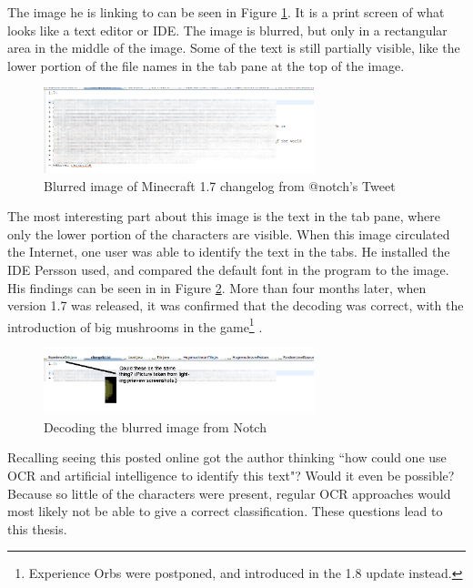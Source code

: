 The image he is linking to can be seen in Figure \ref{fig:notch_imgur}. It is a print screen of what looks like a text editor or \gls{IDE}. The image is blurred, but only in a rectangular area in the middle of the image. Some of the text is still partially visible, like the lower portion of the file names in the tab pane at the top of the image. 

\begin{figure}[ht]
    \centering
    \includegraphics[width=0.7\textwidth]{fig/chapter1/notch_eclipse.png}
    \caption{Blurred image of Minecraft 1.7 changelog from @notch's Tweet}
    \label{fig:notch_imgur}
\end{figure}

The most interesting part about this image is the text in the tab pane, where only the lower portion of the characters are visible. When this image circulated the Internet, one user was able to identify the text in the tabs. He installed the \gls{IDE} Persson used, and compared the default font in the program to the image. His findings can be seen in in Figure \ref{fig:notch_eclipse_decoded}. More than four months later, when version 1.7 was released, it was confirmed that the decoding was correct, with the introduction of big mushrooms in the game\footnote{Experience Orbs were postponed, and introduced in the 1.8 update instead.} \cite{misc-minecraft.172-changelog}.

\begin{figure}[ht]
    \centering
    \includegraphics[width=0.7\textwidth]{fig/chapter1/notch_eclipse_decoded.png}
    \caption{Decoding the blurred image from Notch}
    \label{fig:notch_eclipse_decoded}
\end{figure}

Recalling seeing this posted online got the author thinking ``how could one use OCR and artificial intelligence to identify this text"? Would it even be possible? Because so little of the characters were present, regular OCR approaches would most likely not be able to give a correct classification. These questions lead to this thesis.
